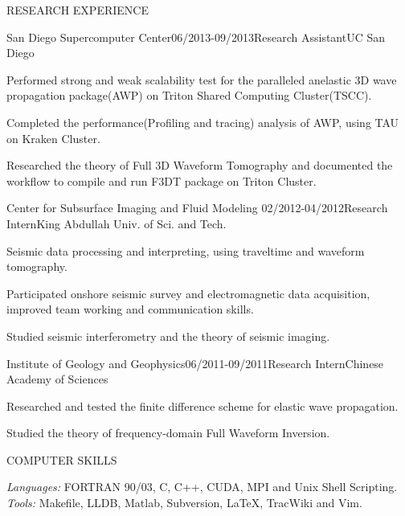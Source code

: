 \documentclass{resume} %
\begin{document}
\begin{rSection}{RESEARCH  EXPERIENCE}
\begin{rSubsection}{San Diego Supercomputer Center}{06/2013-09/2013}{Research Assistant}{UC San Diego}
\item Performed strong and weak scalability test for the paralleled anelastic 3D wave propagation package(AWP) on Triton Shared Computing Cluster(TSCC). 
\item Completed the performance(Profiling and tracing) analysis of AWP, using TAU on Kraken Cluster. 
\item Researched the theory of Full 3D Waveform Tomography and documented the workflow to compile and run F3DT package on Triton Cluster.
\end{rSubsection}


\begin{rSubsection}{Center for Subsurface Imaging and Fluid Modeling
}{02/2012-04/2012}{Research Intern}{King Abdullah Univ. of Sci. and Tech.}

\item Seismic data processing and interpreting, using traveltime and waveform tomography.
\item Participated onshore seismic survey and electromagnetic data acquisition, improved team working and communication skills.
\item Studied seismic interferometry and the theory of seismic imaging.

\end{rSubsection}

\begin{rSubsection}{Institute of Geology and Geophysics}{06/2011-09/2011}{Research Intern}{Chinese Academy of Sciences}

\item Researched and tested the finite difference scheme for elastic wave propagation.
\item Studied the theory of frequency-domain Full Waveform Inversion. 

\end{rSubsection}
\end{rSection}


\begin{rSection}{COMPUTER SKILLS}

{\sl Languages:} 
FORTRAN 90/03, C, C++, CUDA,  MPI and Unix Shell Scripting. \\
{\sl Tools:} 
\quad \quad  Makefile, LLDB, Matlab, Subversion, LaTeX, TracWiki and Vim.
\end{rSection}
\end{document}
